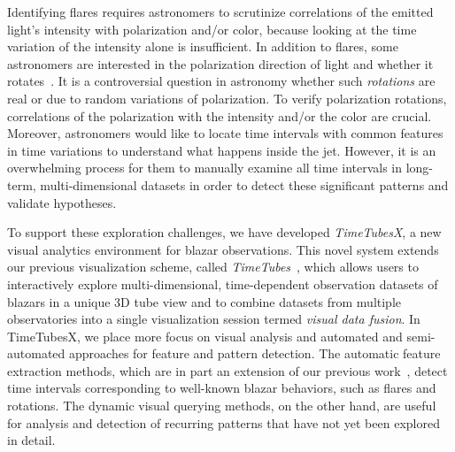 Identifying flares requires astronomers to scrutinize correlations of the emitted light's intensity with polarization and/or color, because looking at the time variation of the intensity alone is insufficient. %
%
In addition to flares, some astronomers are interested in the polarization direction of light and whether it rotates~\cite{Marscher2008, Uemura2017}.
It is a controversial question in astronomy whether such \textit{rotations} are real or due to random variations of polarization.
To verify polarization rotations, correlations of the polarization with the intensity and/or the color are crucial.
Moreover, astronomers would like to locate time intervals with common features in  time variations
to understand what happens inside the jet.
However, it is an overwhelming process for them to manually examine all time intervals in long-term, multi-dimensional datasets in order to detect these significant patterns and validate hypotheses.

To support these exploration challenges, 
we have developed \textit{TimeTubesX}, a new visual analytics environment for blazar observations. 
%
This novel system extends our previous visualization scheme, called \textit{TimeTubes}~\cite{Fujishiro2018}, 
which allows users to interactively explore multi-dimensional, time-dependent observation datasets of blazars in a unique 3D tube view and to combine datasets from multiple observatories into a single visualization session termed \emph{visual data fusion}.
%
In TimeTubesX, we place more focus on visual analysis and automated and semi-automated approaches for feature and pattern detection.
The automatic feature extraction methods, which are in part an extension of our previous work~\cite{Sawada2018}, detect time intervals corresponding to well-known blazar behaviors, such as flares and rotations.
The dynamic visual querying methods, on the other hand, are useful for analysis and detection of recurring patterns that have not yet been explored in detail. 

